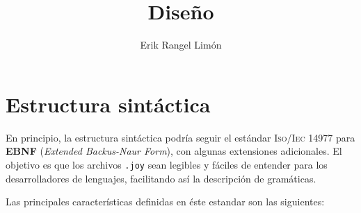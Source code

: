 \documentclass[12pt]{article}
\title{Diseño}
\author{Erik Rangel Limón}
\date{}
\begin{document}
\maketitle


\section*{Estructura sintáctica}

En principio, la estructura sintáctica podría seguir el estándar \textsc{Iso/Iec 14977} para \textbf{EBNF} (\textit{Extended Backus-Naur Form}), con algunas extensiones adicionales. El objetivo es que los archivos \texttt{.joy} sean legibles y fáciles de entender para los desarrolladores de lenguajes, facilitando así la descripción de gramáticas.

Las principales características definidas en éste estandar son las siguientes:
\end{document}
